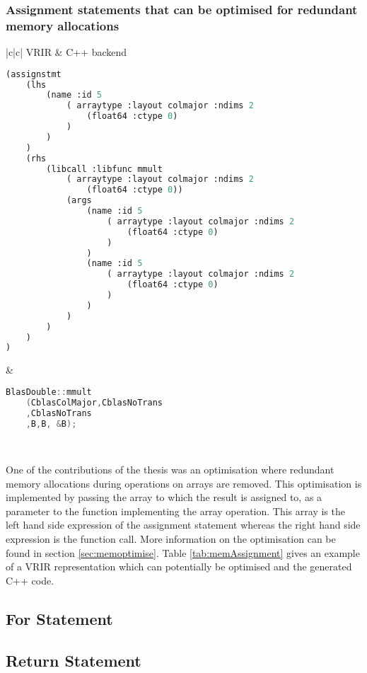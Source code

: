 \subsubsection{Assignment statements that can be optimised  for redundant memory allocations}
\begin{table}[htbp]
\begin{tabular}{|c|c|}
\hline 
VRIR & C++ backend \\
\hline 
{
\begin{lstlisting}[language=lisp, frame=none, numbers=none]
(assignstmt
	(lhs
		(name :id 5
   			( arraytype :layout colmajor :ndims 2
				(float64 :ctype 0)
			)
		)
	)
	(rhs
		(libcall :libfunc mmult
			( arraytype :layout colmajor :ndims 2
				(float64 :ctype 0))
			(args
   				(name :id 5
   					( arraytype :layout colmajor :ndims 2
						(float64 :ctype 0)
					)
				)
				(name :id 5
					( arraytype :layout colmajor :ndims 2
						(float64 :ctype 0)
					)
				)
			)
		)
	)
)
\end{lstlisting}
} & 
{
\begin{lstlisting}[language=c,frame=none, numbers=none]
BlasDouble::mmult
	(CblasColMajor,CblasNoTrans
	,CblasNoTrans
	,B,B, &B);
\end{lstlisting}
} \\
\hline
\end{tabular}
\caption[Assignment with array slice set]{Table shows VRIR with array slicing on the LHS and the equivalent C++ code that is generated.}
\label{tab:memAssignment}
\end{table}
One of the contributions of the thesis was an optimisation where redundant memory allocations during operations on arrays are removed. This optimisation is implemented by passing the array to which the result is assigned to, as a parameter to the function implementing the array operation. This array is the left hand side expression of the assignment statement whereas the right hand side expression is the function call. More information on the optimisation can be found in section \ref{sec:memoptimise}. Table \ref{tab:memAssignment} gives an example of a VRIR representation which can potentially be optimised and the generated C++ code. 
\subsection{For Statement}
\subsection{Return Statement}
